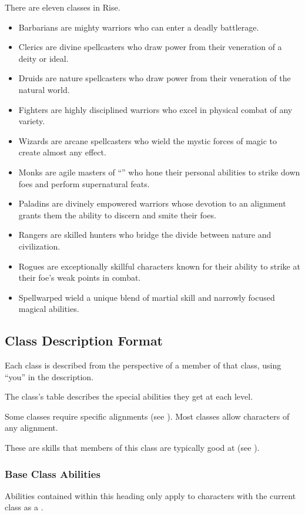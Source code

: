     There are eleven classes in Rise.
    \begin{itemize}
        \item Barbarians are mighty warriors who can enter a deadly battlerage.
        \item Clerics are divine spellcasters who draw power from their veneration of a deity or ideal.
        \item Druids are nature spellcasters who draw power from their veneration of the natural world.
        \item Fighters are highly disciplined warriors who excel in physical combat of any variety.
        \item Wizards are arcane spellcasters who wield the mystic forces of magic to create almost any effect.
        \item Monks are agile masters of ``\ki'' who hone their personal abilities to strike down foes and perform supernatural feats.
        \item Paladins are divinely empowered warriors whose devotion to an alignment grants them the ability to discern and smite their foes.
        \item Rangers are skilled hunters who bridge the divide between nature and civilization.
        \item Rogues are exceptionally skillful characters known for their ability to strike at their foe's weak points in combat.
        \item Spellwarped wield a unique blend of martial skill and narrowly focused magical abilities.
    \end{itemize}

    \subsection{Class Description Format}
        Each class is described from the perspective of a member of that class, using ``you'' in the description.

        The class's table describes the special abilities they get at each level.

        Some classes require specific alignments (see ).
        Most classes allow characters of any alignment.

        These are skills that members of this class are typically good at (see ).

        \subsubsection{Base Class Abilities}
            Abilities contained within this heading only apply to characters with the current class as a .


